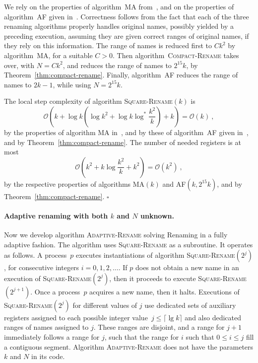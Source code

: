 \documentclass[11pt]{article}
\newcommand{\BBB}{\vspace*{-\bigskipamount}}
\newcommand{\cO}{\mathcal{O}}
\newcommand{\Paragraph}[1]{\BBB\paragraph{#1}}
\newcommand{\qed}{\hfill $\square$ \smallbreak}
\newenvironment{proof}{\noindent{\bf Proof:}}{\qed}
\begin{document}
\begin{proof}
We rely on the properties of algorithm~\textsc{MA} from~\cite{MoirA95}, and on the properties of  algorithm~\textsc{AF} given in~\cite{AttiyaF01}.
Correctness follows from the fact that each of the three renaming algorithms properly handles original names, possibly yielded by a preceding execution, assuming they are given correct  ranges of original names, if they rely on  this information.
The range of names is reduced first  to $Ck^2$ by algorithm~\textsc{MA}, for a suitable $C>0$.
Then algorithm~\textsc{Compact-Rename} takes over, with $N=Ck^2$, and reduces the range of names to $2^{15} k$, by Theorem~\ref{thm:compact-rename}. 
Finally, algorithm~\textsc{AF} reduces the range of names to $2k-1$, while using $N=2^{15} k$.


The local step complexity of algorithm \textsc{Square-Rename}$(k)$ is  
\[
\cO\left(k+\log k \left(\log k^2 + \log k\log^* \frac{k^2}{k}\right) +k\right)=\cO(k)
\ , 
\]
by the properties of  algorithm \textsc{MA} in~\cite{MoirA95}, and by these of  algorithm~\textsc{AF} given in~\cite{AttiyaF01}, and by Theorem~\ref{thm:compact-rename}.
The number of needed registers is at most
\[
\cO\left(k^2+k\log\frac{k^2}{k}+k^2\right)=\cO(k^2)
\ ,
\]
by the respective properties of algorithms \textsc{MA}$(k)$ and \textsc{AF}$(k,2^{15}k)$, and by Theorem~\ref{thm:compact-rename}.
\end{proof}




\Paragraph{Adaptive renaming with both $k$ and $N$ unknown.}



Now we develop algorithm \textsc{Adaptive-Rename} solving Renaming  in a fully adaptive fashion.
The algorithm uses \textsc{Square-Rename} as a subroutine.
It operates as follows.
A process~$p$ executes instantiations of algorithm \textsc{Square-Rename}$(2^j)$, for consecutive integers $i=0,1,2,\ldots$. 
If $p$ does not obtain a new name in an execution of \textsc{Square-Rename}$(2^j)$, then it proceeds to execute \textsc{Square-Rename}$(2^{j+1})$.
Once a process~$p$ acquires a new name, then it halts.
Executions of \textsc{Square-Rename}$(2^{j})$ for different values of $j$ use dedicated sets of auxiliary registers assigned to each possible integer value~$j\le \lceil\lg k\rceil$ and also dedicated ranges of names assigned to $j$.
These ranges are disjoint, and a range for $j+1$ immediately follows a range for $j$, such that the range for $i$ such that $0\le i\le j$ fill a contiguous segment.
Algorithm \textsc{Adaptive-Rename} does  not have the parameters $k$ and $N$ in its code.
\end{document}
